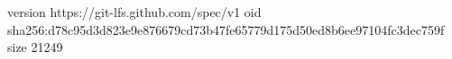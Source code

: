version https://git-lfs.github.com/spec/v1
oid sha256:d78c95d3d823e9e876679cd73b47fe65779d175d50ed8b6ee97104fc3dec759f
size 21249
